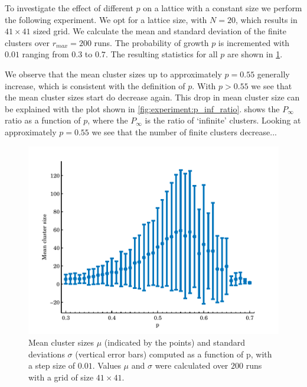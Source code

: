 
To investigate the effect of different $p$ on a lattice with a constant size we perform the following experiment. We opt for a lattice size, with $N = 20$, which results in $41 \times 41$ sized grid. We calculate the mean and standard deviation of the finite clusters over $r_{max} = 200$ runs. The probability of growth $p$ is incremented with $0.01$ ranging from $0.3$ to $0.7$. The resulting statistics for all $p$ are shown in \cref{fig:experiment:mean_std_clusters}.

We observe that the mean cluster sizes up to approximately $p = 0.55$ generally increase, which is consistent with the definition of $p$. With $p > 0.55$ we see that the mean cluster sizes start do decrease again. This drop in mean cluster size can be explained with the plot shown in \cref{fig:experiment:p_inf_ratio}.  shows the $P_\infty$ ratio as a function of $p$, where the $P_\infty$ is the ratio of `infinite' clusters. Looking at approximately $p = 0.55$ we see that the number of finite clusters decrease... 


\begin{figure}
	\centering
	\includegraphics[width=\textwidth]{./img/assignment_a_mean_std_p.pdf}
	\caption{Mean cluster sizes $\mu$ (indicated by the points) and standard deviations $\sigma$ (vertical error bars) computed as a function of p, with a step size of $0.01$. Values $\mu$ and $\sigma$ were calculated over $200$ runs with a grid of size $41 \times 41$.}
	\label{fig:experiment:mean_std_clusters}
\end{figure}

